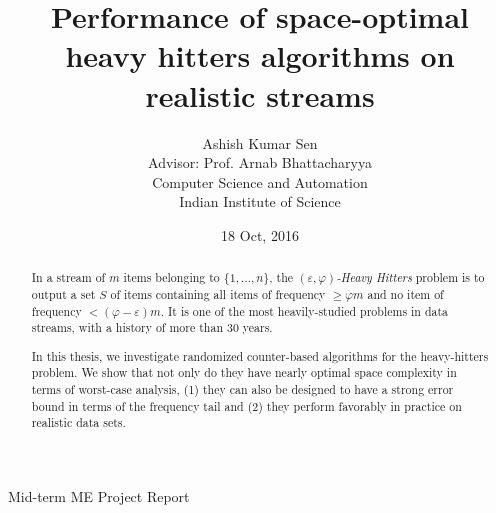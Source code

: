 \documentclass{article}
\title{\large \bf Performance of space-optimal 	heavy hitters algorithms on realistic streams}
\author{Ashish Kumar Sen\\Advisor: Prof. Arnab Bhattacharyya\\
    Computer Science and Automation\\
    Indian Institute of Science}
\date{18 Oct, 2016}
\newcommand{\ignore}[1]{}
\newcommand{\eps}{\varepsilon}
\renewcommand{\phi}{\varphi}
\begin{document}
	\maketitle
    \begin{center}
        Mid-term ME Project Report
    \end{center}
        \vskip 12pt
	\thispagestyle{empty}
	
	
	    \begin{abstract}
In a stream of $m$ items belonging to $\{1, \dots, n\}$, the {\em $(\eps, \phi)$-Heavy Hitters} problem is to output a set $S$ of items containing all items of frequency $\geq \phi m$ and no item of frequency $< (\phi-\eps)m$. It is one of the most heavily-studied problems in data streams, with a history of more than 30 years. 

In this thesis, we investigate randomized counter-based algorithms for the heavy-hitters problem. We show that not only do they have nearly optimal space complexity in terms of worst-case analysis, (1) they can also be designed to have a strong error bound in terms of the frequency tail and (2) they perform favorably in practice on realistic data sets.

\ignore{
In the recent paper {\em An Optimal Algorithm for $\ell_1$-Heavy Hitters in Insertion Streams and Related Problems} by Bhattacharyya, Dey and Woodruff, the first space-optimal bounds have been given for returning the $\ell_1$-heavy hitters in a data stream of insertions, as well as  their approximate frequencies. Suppose there is stream of $m$ items in $\left\{1,2,.....n\right\}$ and we have parameters $0< \varepsilon <\varphi$ $\leqslant$ 1. For each item $i$ in the stream, let $f_i$ be the frequency of item $i$,  i.e the number of times item $i$ is repeated in the stream. This algorithm returns all items $i$ for which $f_i \geq \varphi m$ and returns no items $j$ for which $f_j \leq (\varphi-\varepsilon)m$. The space complexity of this algorithm is  $O(\varepsilon^{-1} \log \varphi^{-1} + \varphi^{-1} \log n + \log \log m)$ bits of space and the update time and reporting time for this algorithm are $O(1)$ in worst case and linear in the output size respectively. The algorithm has a randomized guarantee unlike previous algorithms in this setting.

The goal of this thesis is to experimentally validate the performance of this algorithm against older, more established algorithms.  We also aim to give stronger theoretical bounds for streams whose frequency distribution follow Zipf's law.
}	  
	\end{abstract}	
	
\end{document}
